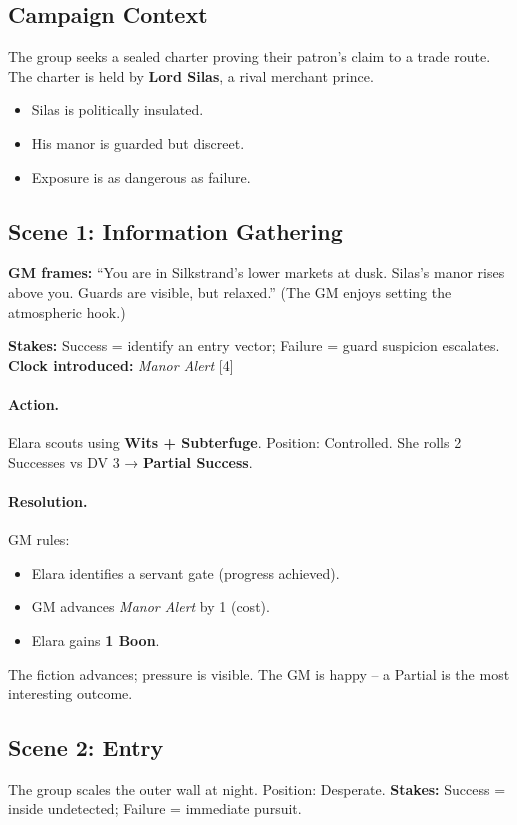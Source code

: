 \subsection*{Campaign Context}
The group seeks a sealed charter proving their patron’s claim to a trade route. The charter is held by \textbf{Lord Silas}, a rival merchant prince.
\begin{itemize}
  \item Silas is politically insulated.
  \item His manor is guarded but discreet.
  \item Exposure is as dangerous as failure.
\end{itemize}

\subsection*{Scene 1: Information Gathering}
\textbf{GM frames:} “You are in Silkstrand’s lower markets at dusk. Silas’s manor rises above you. Guards are visible, but relaxed.” (The GM enjoys setting the atmospheric hook.)

\noindent\textbf{Stakes:} Success = identify an entry vector; Failure = guard suspicion escalates.
\noindent\textbf{Clock introduced:} \emph{Manor Alert} [4]

\paragraph{Action.} Elara scouts using \textbf{Wits + Subterfuge}. Position: Controlled.  
She rolls 2 Successes vs DV 3 → \textbf{Partial Success}.

\paragraph{Resolution.} GM rules:
\begin{itemize}
  \item Elara identifies a servant gate (progress achieved).
  \item GM advances \emph{Manor Alert} by 1 (cost).
  \item Elara gains \textbf{1 Boon}.
\end{itemize}
The fiction advances; pressure is visible. The GM is happy – a Partial is the most interesting outcome.

\subsection*{Scene 2: Entry}
The group scales the outer wall at night. Position: Desperate.  
\textbf{Stakes:} Success = inside undetected; Failure = immediate pursuit.

